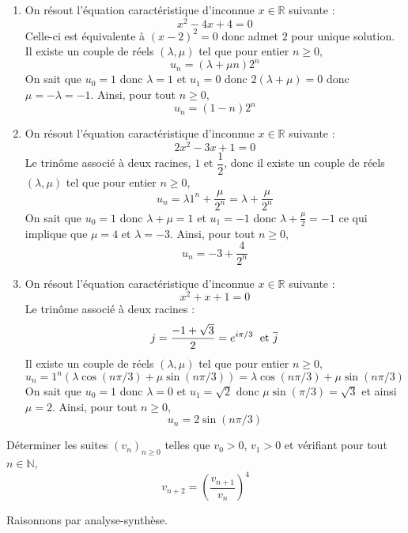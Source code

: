 \documentclass[a4paper,10pt]{report}
\begin{document}
\begin{enumerate}
\item On résout l'équation caractéristique d'inconnue $x \in \mathbb{R}$ suivante :
$$ x^2-4x+4=0$$
Celle-ci est équivalente à $(x-2)^2=0$ donc admet $2$ pour unique solution. Il existe un couple de réels $(\lambda, \mu)$ tel que pour entier $n \geq 0$,
$$ u_{n} = (\lambda + \mu n) 2^n$$
On sait que $u_0= 1$ donc $\lambda=1$ et $u_1=0$ donc $2(\lambda+\mu)=0$ donc $\mu= - \lambda = -1$. Ainsi, pour tout $n \geq 0$,
$$ u_n = (1-n)2^n$$
\item On résout l'équation caractéristique d'inconnue $x \in \mathbb{R}$ suivante :
$$ 2x^2-3x+1=0$$
Le trinôme associé à deux racines, $1$ et $\dfrac{1}{2}$, donc il existe un couple de réels $(\lambda, \mu)$ tel que pour entier $n \geq 0$,
$$ u_{n} = \lambda 1^n + \dfrac{\mu}{2^n} = \lambda +\dfrac{\mu}{2^n}$$
On sait que $u_0= 1$ donc $\lambda+ \mu=1$ et $u_1=-1$ donc $\lambda+\frac{\mu}{2}=-1$ ce qui implique que $\mu=4$ et $\lambda = -3$. Ainsi, pour tout $n \geq 0$,
$$ u_n =-3 + \dfrac{4}{2^n}$$
\item On résout l'équation caractéristique d'inconnue $x \in \mathbb{R}$ suivante :
$$ x^2+x+1=0$$
Le trinôme associé à deux racines :
$$ j = \dfrac{-1+\sqrt{3}}{2} = e^{i \pi/3} \; \hbox{ et } \overline{j}$$
Il existe un couple de réels $(\lambda, \mu)$ tel que pour entier $n \geq 0$,
$$ u_{n} = 1^n (\lambda \cos(n \pi/3) + \mu \sin(n \pi/3)) = \lambda \cos(n \pi/3) + \mu \sin(n \pi/3)$$
On sait que $u_0= 1$ donc $\lambda=0$ et $u_1=\sqrt{2}$ donc $\mu \sin(\pi/3)=\sqrt{3}$ et ainsi $\mu=2$. Ainsi, pour tout $n \geq 0$,
$$ u_n = 2 \sin(n \pi/3)$$
\end{enumerate}

\medskip


\begin{Exercice}{} Déterminer les suites $(v_n)_{n \geq 0}$ telles que $v_0>0$, $v_1>0$  et vérifiant pour tout $n \in \mathbb{N}$, 
$$v_{n+2}=\left(\dfrac{v_{n+1}}{v_n}\right)^4$$
\end{Exercice}


\corr Raisonnons par analyse-synthèse. 

\medskip
\end{document}
